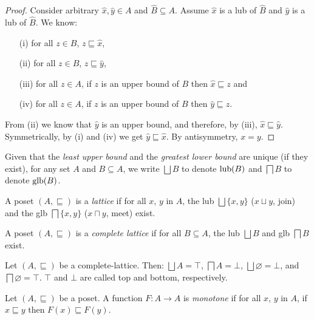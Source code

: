 \begin{proof}
    Consider arbitrary $\hat{x}, \hat{y} \in A$ and $\hat B \subseteq A$. Assume $\hat x$ is a lub of $\hat B$
    and $\hat y$ is a lub of $\hat B$. We know:
    \begin{enumerate}
        \item[(i)] for all $z \in B$, $z \sqsubseteq \hat{x}$,
        \item[(ii)] for all $z \in B$, $z \sqsubseteq \hat{y}$,
        \item[(iii)] for all $z \in A$, if $z$ is an upper bound of $B$ then
        $\hat x \sqsubseteq z$ and
        \item[(iv)]for all $z \in A$, if $z$ is an upper bound of $B$ then $\hat
        y \sqsubseteq z$.
    \end{enumerate}
    From (ii) we know that $\hat{y}$ is an upper bound, and therefore, by (iii), $\hat{x} \sqsubseteq \hat{y}$. Symmetrically, by (i) and (iv) we get $\hat{y} \sqsubseteq \hat{x}$. By antisymmetry, $x = y$.
\end{proof}

Given that the \emph{least upper bound} and the \emph{greatest lower bound} are unique (if they exist), for any set $A$ and $B \subseteq A$, we write $\bigsqcup B$ to denote $\operatorname{lub}(B)$ and $\bigsqcap B$ to denote $\operatorname{glb}(B)$.

\begin{definition}[Lattice]
    A poset $(A,\sqsubseteq)$ is a \emph{lattice} if for all $x$, $y$ in $A$, the lub $\bigsqcup \{x,y\}$ ($x \sqcup y$, join) and the glb $\bigsqcap \{x,y\}$ ($x \sqcap y$, meet) exist.
\end{definition}

\begin{definition}
    A poset $(A,\sqsubseteq)$ is a \emph{complete lattice} if for all $B \subseteq A$, the lub $\bigsqcup B$ and glb $\bigsqcap B$ exist.
\end{definition}

\begin{example}
    Let $(A,\sqsubseteq)$ be a complete-lattice. Then: $\bigsqcup A = \top$, $\bigsqcap A = \bot$, $\bigsqcup \varnothing = \bot$, and $\bigsqcap \varnothing = \top$. $\top$ and $\bot$ are called top and bottom, respectively.
\end{example}

\begin{definition}
Let $(A, \sqsubseteq)$ be a poset. A function $F: A \to A$ is \emph{monotone} if for all $x$, $y$ in $A$, if $x \sqsubseteq y$ then $F(x) \sqsubseteq F(y)$.
\end{definition}

